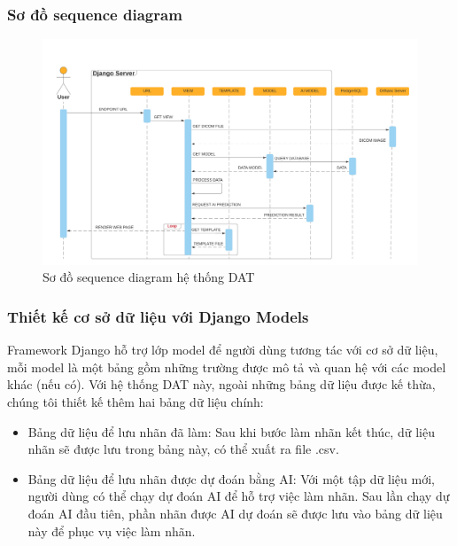 \subsubsection{Sơ đồ sequence diagram}
\begin{figure}[H]
    \centering
    \includegraphics[width=14cm]{images/chapter-07-images/sequence-diagram.png}
    \caption{Sơ đồ sequence diagram hệ thống DAT}
\end{figure}

\subsubsection{Thiết kế cơ sở dữ liệu với Django Models}
Framework Django hỗ trợ lớp model để người dùng tương tác với cơ sở dữ liệu, mỗi model là một bảng gồm những trường được mô tả và quan hệ với các model khác (nếu có). Với hệ thống DAT này, ngoài những bảng dữ liệu được kế thừa, chúng tôi thiết kế thêm hai bảng dữ liệu chính:
\begin{itemize}
    \item Bảng dữ liệu để lưu nhãn đã làm: Sau khi bước làm nhãn kết thúc, dữ liệu nhãn sẽ được lưu trong bảng này, có thể xuất ra file .csv.
    \item Bảng dữ liệu để lưu nhãn được dự đoán bằng AI: Với một tập dữ liệu mới, người dùng có thể chạy dự đoán AI để hỗ trợ việc làm nhãn. Sau lần chạy dự đoán AI đầu tiên, phần nhãn được AI dự đoán sẽ được lưu vào bảng dữ liệu này để phục vụ việc làm nhãn. 
\end{itemize}


